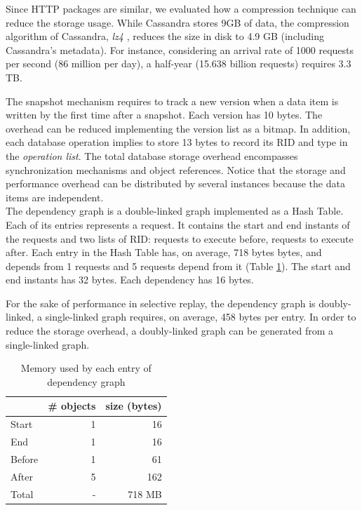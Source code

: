 Since \ac{HTTP} packages are similar, we evaluated how a compression technique can reduce the storage usage. While Cassandra stores 9GB of data, the compression algorithm of Cassandra, \emph{lz4} \cite{lz4}, reduces the size in disk to 4.9 GB (including Cassandra's metadata). For instance, considering an arrival rate of 1000 requests per second (86 million per day), a half-year (15.638 billion requests) requires 3.3 TB. 



The snapshot mechanism requires to track a new version when a data item is written by the first time after a snapshot. Each version has 10 bytes. The overhead can be reduced implementing the version list as a bitmap. In addition, each database operation implies to store 13 bytes to record its \acf{RID} and type in the \emph{operation list}. The total database storage overhead encompasses synchronization mechanisms and object references. Notice that the storage and performance overhead can be distributed by several instances because the data items are independent. \\

The dependency graph is a double-linked graph implemented as a Hash Table. Each of its entries represents a request. It contains the start and end instants of the requests and two lists of \ac{RID}: requests to execute before, requests to execute after. Each entry in the Hash Table has, on average, 718 bytes bytes, and depends from 1 requests and 5 requests depend from it (Table \ref{tab:memory:depgrah}). The start and end instants has 32 bytes. Each dependency has 16 bytes. 

For the sake of performance in selective replay, the dependency graph is doubly-linked, a single-linked graph requires, on average, 458 bytes per entry. In order to reduce the storage overhead, a doubly-linked graph can be generated from a single-linked graph.


\begin{table}[ht]
\centering   
\footnotesize
  \begin{tabular}{l|rr}     
           & \# objects & size (bytes) \\ \hline  
  Start    & 1          & 16           \\
  End      & 1          & 16           \\                        
  Before   & 1          & 61           \\     %
  After    & 5          & 162          \\     %
  Total    & -          & 718 MB       \\     %
  \end{tabular}            
\caption{Memory used by each entry of dependency graph}
\label{tab:memory:depgrah}
\end{table}

